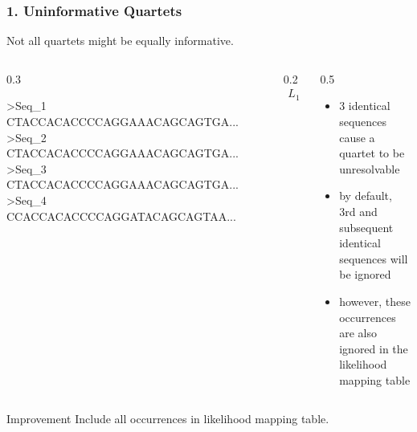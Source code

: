 \documentclass[aspectratio=169]{beamer}
\begin{document}
\begin{frame}[fragile]
    \frametitle{1. Uninformative Quartets}
    Not all quartets might be equally informative.
    \begin{example}
        \begin{columns}
            \begin{column}{0.3\textwidth}
                \scriptsize
                \begin{semiverbatim}
>Seq_1      
CTACCACACCCCAGGAAACAGCAGTGA...
>Seq_2
CTACCACACCCCAGGAAACAGCAGTGA...
>Seq_3      
CTACCACACCCCAGGAAACAGCAGTGA...
>Seq_4       
CCACCACACCCCAGGATACAGCAGTAA...
                \end{semiverbatim}
            \end{column}
            \begin{column}{0.2\textwidth}
                \begin{align*}
                    L_1 &= L_2 = L_3\\
                    &\implies\\
                    &p_i = \frac{1}{3} 
                \end{align*}
            \end{column}
            \begin{column}{0.5\textwidth}
                \begin{itemize}
                    \item 3 identical sequences cause a quartet to be unresolvable
                    \item by default, 3rd and subsequent identical sequences will be ignored 
                    \item however, these occurrences are also ignored in the likelihood mapping table
                \end{itemize}
            \end{column}
        \end{columns}
    \end{example}
    \begin{block}{Improvement}
        Include all occurrences in likelihood mapping table. 
    \end{block}
\end{frame}
\end{document}
